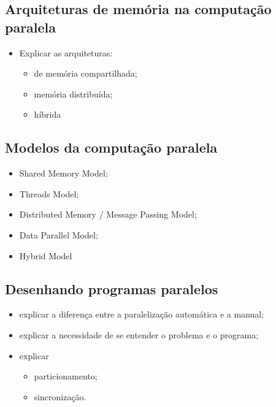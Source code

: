     \subsection{Arquiteturas de memória na computação paralela}
    
        \begin{itemize}
            \item Explicar as arquiteturas:
            \begin{itemize}
                \item de memória compartilhada;
                \item memória distribuída;
                \item híbrida
            \end{itemize}
        \end{itemize}
    
    \subsection{Modelos da computação paralela}
    
        \begin{itemize}
            \item Shared Memory Model;
            \item Threads Model;
            \item Distributed Memory / Message Passing Model;
            \item Data Parallel Model;
            \item Hybrid Model
        \end{itemize}
    
    \subsection{Desenhando programas paralelos}
    
        \begin{itemize}
            \item explicar a diferença entre a paralelização automática e a 
            manual;
            \item explicar a necessidade de se entender o problema e o programa;
            \item explicar
            \begin{itemize}
            	\item particionamento;
            	\item sincronização.
            \end{itemize}
        \end{itemize}